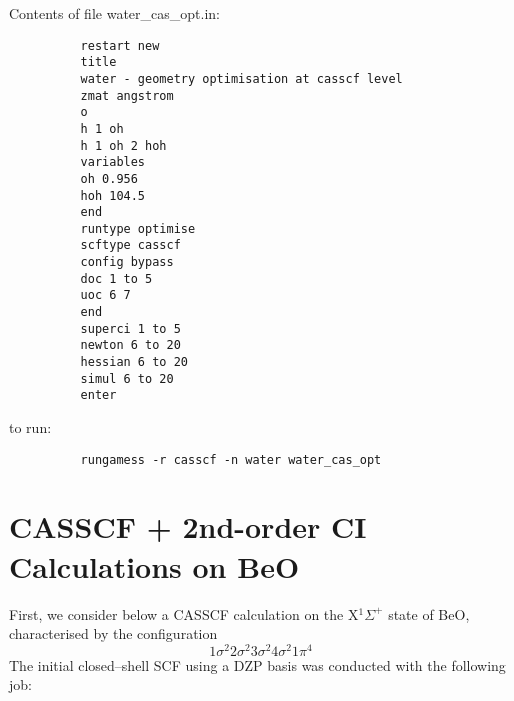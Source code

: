 \documentclass[11pt,fleqn]{article}
\begin{document}
Contents of file water\_cas\_opt.in:
{
\footnotesize
\begin{verbatim}
          restart new
          title
          water - geometry optimisation at casscf level
          zmat angstrom
          o
          h 1 oh
          h 1 oh 2 hoh
          variables
          oh 0.956
          hoh 104.5
          end
          runtype optimise
          scftype casscf
          config bypass
          doc 1 to 5
          uoc 6 7
          end
          superci 1 to 5
          newton 6 to 20
          hessian 6 to 20
          simul 6 to 20
          enter
\end{verbatim}
}
to run:
{
\footnotesize
\begin{verbatim}
          rungamess -r casscf -n water water_cas_opt
\end{verbatim}
}

\section[CASSCF + 2nd-order CI Calculations on BeO]{CASSCF + 2nd-order CI Calculations on BeO}

First, we consider below a CASSCF calculation 
on the X$^{1}\Sigma^{+}$ state
of BeO, characterised by the configuration
\begin{equation}
  1\sigma^2 2\sigma^2 3\sigma^2 4\sigma^2 1\pi^4 
\end{equation}
The initial closed--shell SCF using a DZP basis was conducted with the
following job:
\end{document}
